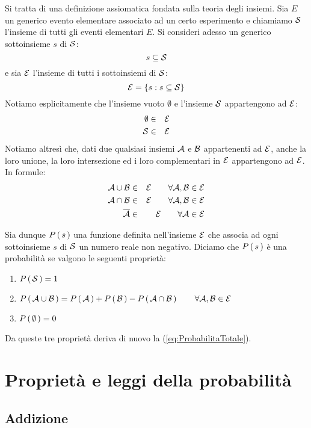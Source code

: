 Si tratta di una definizione assiomatica fondata sulla teoria degli insiemi.
Sia $E$ un generico evento elementare associato ad un certo
esperimento e chiamiamo ${\cal S}$ l'insieme di tutti gli eventi elementari
$E$. Si consideri adesso un generico  sottoinsieme $s$ di ${\cal S}$:
$$
s\subseteq {\cal S}
$$
e sia ${\cal E}$ l'insieme di tutti i sottoinsiemi di ${\cal S}$:
$$
{\cal E} = \{s: s\subseteq {\cal S}\}
$$
Notiamo esplicitamente che l'insieme vuoto $\emptyset$ e l'insieme  ${\cal S}$
appartengono ad ${\cal E}$:
\begin{eqnarray*}
\emptyset & \in & {\cal E}\\
{\cal S}  & \in & {\cal E}
\end{eqnarray*}
Notiamo altres\`i che, dati due qualsiasi insiemi ${\cal A}$ e ${\cal B}$
appartenenti ad ${\cal E}$, anche la loro unione, la loro intersezione
ed i loro complementari in ${\cal E}$ appartengono ad ${\cal E}$.
In formule:
\begin{eqnarray*}
{\cal A} \cup {\cal B} & \in & {\cal E}
\qquad \forall {\cal A}, {\cal B} \in {\cal E}\\
{\cal A} \cap {\cal B} & \in & {\cal E}
\qquad \forall {\cal A}, {\cal B} \in {\cal E}\\
\overline {\cal A} & \in & {\cal E}
\qquad \forall {\cal A} \in {\cal E}
\end{eqnarray*}

Sia dunque $\displaystyle P\left(\, s \, \right)$ una funzione definita nell'insieme ${\cal E}$ che
associa ad ogni sottoinsieme $s$ di $\cal{S}$ un numero reale non negativo.
Diciamo che $\displaystyle P\left(\, s \, \right)$ \`e una probabilit\`a se valgono le seguenti propriet\`a:
\begin{enumerate}
\item{
$\displaystyle P\left(\, {\cal S} \, \right) = 1$
}
\item{
$\displaystyle P\left(\, {\cal A} \cup {\cal B} \, \right) = \displaystyle P\left(\, {\cal A} \, \right) + \displaystyle P\left(\, {\cal B} \, \right) -
\displaystyle P\left(\, {\cal A} \cap {\cal B} \, \right)
\qquad \forall {\cal A}, {\cal B} \in {\cal E}$
}
\item{
$\displaystyle P\left(\, \emptyset \, \right) = 0$
}
\end{enumerate}
Da queste tre propriet\`a deriva di nuovo la (\ref{eq:ProbabilitaTotale}).


\section{Propriet\`a e leggi della probabilit\`a}

\subsection{Addizione}

